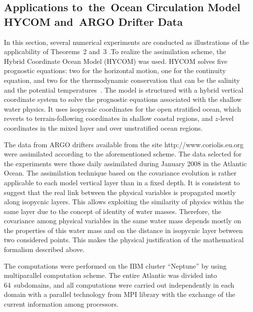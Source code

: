 \begin{multicols}{2}

\section{Applications to~the~Ocean Circulation Model HYCOM and~ARGO Drifter Data}

\noindent
In this section, several numerical experiments are conducted as illustrations of 
the applicability of Theorems~2 and~3 .To realize the assimilation scheme, the Hybrid Coordinate 
Ocean Model (HYCOM) was used. HYCOM solves five prognostic equations: two for the horizontal 
motion, one for the continuity equation, and two for the thermodynamic conservation that can 
be the salinity and the potential temperatures~\cite{8-b, 9-b}. The model is structured with a hybrid vertical 
coordinate system to solve the prognostic equations associated with the shallow water physics. 
It uses isopycnic coordinates for the open stratified ocean, which reverts to terrain-following 
coordinates in shallow coastal regions, and $z$-level coordinates in the mixed layer and over 
unstratified ocean regions.

The data from ARGO drifters available from the site 
{\sf http://www.coriolis.eu.org} were assimilated according to the aforementioned scheme. 
The data selected for the experiments were those daily assimilated
during January 2008 in the Atlantic Ocean. The assimilation technique based on the covariance evolution 
is rather applicable to each model vertical layer than in a fixed depth. 
It is consistent 
to suggest that the real link between the physical variables is propagated mostly along 
isopycnic layers. This allows exploiting the similarity of physics within the same layer 
due to the concept of identity of water masses. Therefore, the covariance among physical 
variables in the same water mass depends mostly on the properties of this water mass and on 
the distance in isopycnic layer between two considered points. This makes the physical 
justification of the mathematical formalism described above.

The computations were performed on the IBM cluster ``Neptune'' by using 
multiparallel computation scheme. The entire Atlantic was divided into 64~subdomains, and 
all computations were carried out independently in each domain with a parallel technology 
from MPI library with the exchange of the current information among processors.


\end{multicols}
